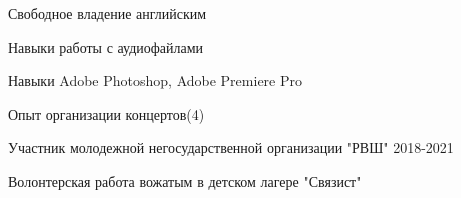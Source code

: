 
\hfill
\begin{cvitems} \footnotesize
    \item {Свободное владение английским}
    \item {Навыки работы с аудиофайлами}
    \item {Навыки Adobe Photoshop, Adobe Premiere Pro}
    \item {Опыт организации концертов(4)}
    \item {Участник молодежной негосударственной организации "РВШ" 2018-2021}
    \item {Волонтерская работа вожатым в детском лагере "Связист"}
\end{cvitems}
